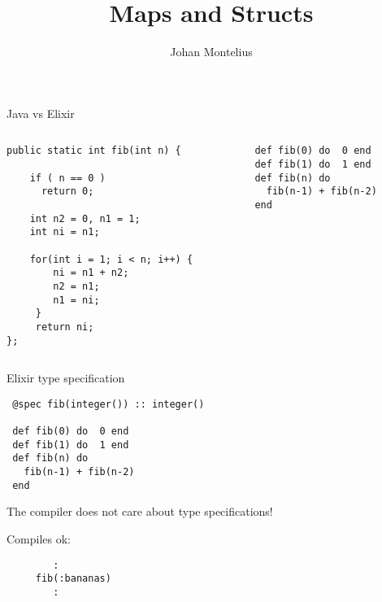 

\title[ID1019 Maps and Structs]{Maps and Structs}


\author{Johan Montelius}
\date{\semester}



\begin{frame}
\titlepage
\end{frame}


\begin{frame}[fragile]{Java vs Elixir}

  \pause
  \begin{columns}
    \begin{column}{0.6\textwidth}
\begin{verbatim}
public static int fib(int n) {

    if ( n == 0 )
      return 0;

    int n2 = 0, n1 = 1;
    int ni = n1;

    for(int i = 1; i < n; i++) { 
        ni = n1 + n2;  
        n2 = n1;
        n1 = ni; 
     }
     return ni;
};
\end{verbatim}      
    \end{column}
    \begin{column}{0.4\textwidth}
\begin{verbatim}
def fib(0) do  0 end
def fib(1) do  1 end
def fib(n) do
  fib(n-1) + fib(n-2)
end
\end{verbatim}
    \end{column}
  \end{columns}


\end{frame} 

\begin{frame}[fragile]{Elixir type specification}

\pause\vspace{10pt}
\begin{verbatim}
 @spec fib(integer()) :: integer()

 def fib(0) do  0 end
 def fib(1) do  1 end
 def fib(n) do
   fib(n-1) + fib(n-2)
 end
\end{verbatim}

\vspace{20pt}\pause The compiler does not care about type specifications!

\vspace{10pt}\pause Compiles ok:
\begin{verbatim}
        :
     fib(:bananas)
        :
\end{verbatim}

\end{frame}



